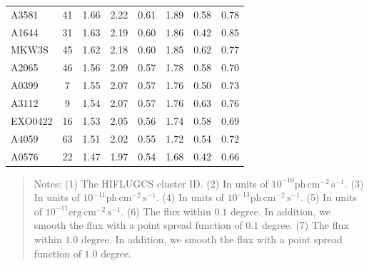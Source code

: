 \documentclass[10pt,aps,pra,reprint,amsmath,amsfonts,amssymb,showpacs,nofootinbib,floatfix]{revtex4-1}
\newcommand{\rmn}{\mathrm}
\begin{document}
\begin{table}
\begin{minipage}{2.0\columnwidth}
\begin{tabular}{l  c c c c c c c}
A3581    &  41 &   1.66 &   2.22 &   0.61 &   1.89 &   0.58 &   0.78 \\
A1644    &  31 &   1.63 &   2.19 &   0.60 &   1.86 &   0.42 &   0.85 \\
MKW3S    &  45 &   1.62 &   2.18 &   0.60 &   1.85 &   0.62 &   0.77 \\
A2065    &  46 &   1.56 &   2.09 &   0.57 &   1.78 &   0.58 &   0.70 \\
A0399    &   7 &   1.55 &   2.07 &   0.57 &   1.76 &   0.50 &   0.73 \\
A3112    &   9 &   1.54 &   2.07 &   0.57 &   1.76 &   0.63 &   0.76 \\
EXO0422  &  16 &   1.53 &   2.05 &   0.56 &   1.74 &   0.58 &   0.69 \\
A4059    &  63 &   1.51 &   2.02 &   0.55 &   1.72 &   0.54 &   0.72 \\
A0576    &  22 &   1.47 &   1.97 &   0.54 &   1.68 &   0.42 &   0.66 \\
\hline
\hline
\end{tabular}
\begin{quote}
  Notes: 
   (1) The HIFLUGCS cluster ID.
   (2) In units of  $10^{-10} \rmn{ph}\,\rmn{cm}^{-2}\,\rmn{s}^{-1}$.
   (3) In units of  $10^{-11} \rmn{ph}\,\rmn{cm}^{-2}\,\rmn{s}^{-1}$.
   (4) In units of  $10^{-13} \rmn{ph}\,\rmn{cm}^{-2}\,\rmn{s}^{-1}$.
   (5) In units of  $10^{-11} \rmn{erg}\,\rmn{cm}^{-2}\,\rmn{s}^{-1}$.
   (6) The flux within $0.1$ degree. In addition, we smooth the flux with a point spread function of $0.1$ degree. 
   (7) The flux within $1.0$ degree. In addition, we smooth the flux with a point spread function of $1.0$ degree. 
 \label{tab:flux_tab_CRs}
  \end{quote}
\end{minipage}
\end{table} 
\end{document}
